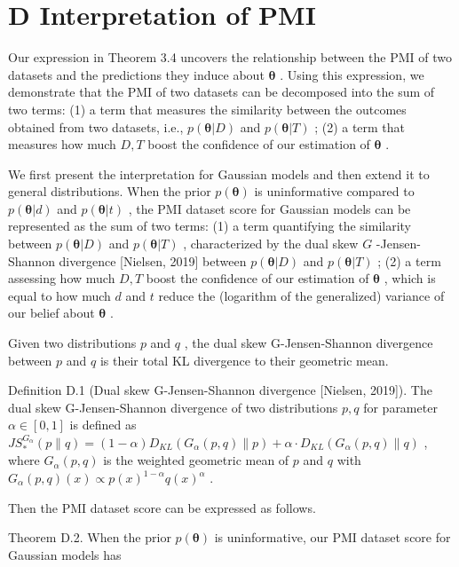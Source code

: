 \section{D Interpretation of PMI}\label{d-interpretation-of-pmi}

Our expression in Theorem 3.4 uncovers the relationship between the PMI
of two datasets and the predictions they induce about \(\pmb \theta\) .
Using this expression, we demonstrate that the PMI of two datasets can
be decomposed into the sum of two terms: (1) a term that measures the
similarity between the outcomes obtained from two datasets, i.e.,
\(p ( \pmb { \theta } | D )\) and \(p ( \pmb \theta | T )\) ; (2) a term
that measures how much \(D , T\) boost the confidence of our estimation
of \(\pmb \theta\) .

We first present the interpretation for Gaussian models and then extend
it to general distributions. When the prior \(p ( \pmb \theta )\) is
uninformative compared to \(p ( \pmb \theta | d )\) and
\(p ( \pmb \theta | t )\) , the PMI dataset score for Gaussian models
can be represented as the sum of two terms: (1) a term quantifying the
similarity between \(p ( \pmb { \theta } | D )\) and
\(p ( \pmb \theta | T )\) , characterized by the dual skew \(G\)
-Jensen-Shannon divergence {[}Nielsen, 2019{]} between
\(p ( \pmb { \theta } | D )\) and \(p ( \pmb \theta | T )\) ; (2) a term
assessing how much \(D , T\) boost the confidence of our estimation of
\(\pmb \theta\) , which is equal to how much \(d\) and \(t\) reduce the
(logarithm of the generalized) variance of our belief about
\(\pmb \theta\) .

Given two distributions \(p\) and \(q\) , the dual skew G-Jensen-Shannon
divergence between \(p\) and \(q\) is their total KL divergence to their
geometric mean.

Definition D.1 (Dual skew G-Jensen-Shannon divergence {[}Nielsen,
2019{]}). The dual skew G-Jensen-Shannon divergence of two distributions
\(p , q\) for parameter \(\alpha \in [ 0 , 1 ]\) is defined as
\(J S _ { * } ^ { G _ { \alpha } } ( p \| q ) = ( 1 - \alpha ) D _ { K L } ( G _ { \alpha } ( p , q ) \| p ) + \alpha \cdot D _ { K L } ( G _ { \alpha } ( p , q ) \| q )\)
, where \(G _ { \alpha } ( p , q )\) is the weighted geometric mean of
\(p\) and \(q\) with
\(G _ { \alpha } ( p , q ) ( x ) \propto p ( x ) ^ { 1 - \alpha } q ( x ) ^ { \alpha }\)
.

Then the PMI dataset score can be expressed as follows.

Theorem D.2. When the prior \(p ( \pmb \theta )\) is uninformative, our
PMI dataset score for Gaussian models has


